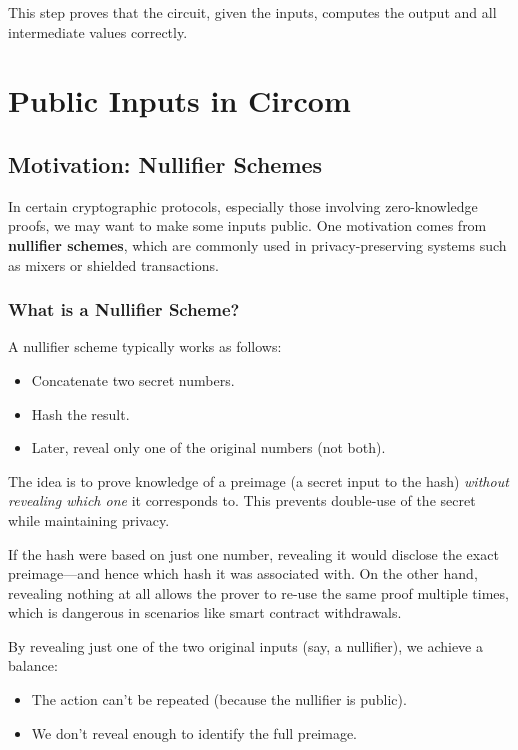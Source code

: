 \documentclass{article}
\begin{document}
This step proves that the circuit, given the inputs, computes the output and all intermediate values correctly.

\section{Public Inputs in Circom}

\subsection*{Motivation: Nullifier Schemes}

In certain cryptographic protocols, especially those involving zero-knowledge proofs, we may want to make some inputs public. One motivation comes from \textbf{nullifier schemes}, which are commonly used in privacy-preserving systems such as mixers or shielded transactions.

\subsubsection*{What is a Nullifier Scheme?}

A nullifier scheme typically works as follows:
\begin{itemize}
	\item Concatenate two secret numbers.
	\item Hash the result.
	\item Later, reveal only one of the original numbers (not both).
\end{itemize}

The idea is to prove knowledge of a preimage (a secret input to the hash) \emph{without revealing which one} it corresponds to. This prevents double-use of the secret while maintaining privacy.

\vspace{0.5em}
If the hash were based on just one number, revealing it would disclose the exact preimage—and hence which hash it was associated with. On the other hand, revealing nothing at all allows the prover to re-use the same proof multiple times, which is dangerous in scenarios like smart contract withdrawals.

By revealing just one of the two original inputs (say, a nullifier), we achieve a balance:
\begin{itemize}
	\item The action can't be repeated (because the nullifier is public).
	\item We don’t reveal enough to identify the full preimage.
\end{itemize}
\end{document}
